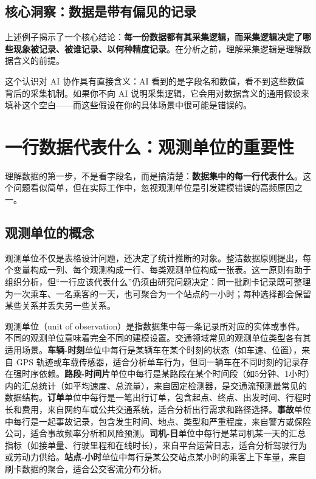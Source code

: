 \subsection{核心洞察：数据是带有偏见的记录}

上述例子揭示了一个核心结论：\textbf{每一份数据都有其采集逻辑，而采集逻辑决定了哪些现象被记录、被谁记录、以何种精度记录}。在分析之前，理解采集逻辑是理解数据含义的前提。

这个认识对 AI 协作具有直接含义：AI 看到的是字段名和数值，看不到这些数值背后的采集机制。如果你不向 AI 说明采集逻辑，它会用对数据含义的通用假设来填补这个空白——而这些假设在你的具体场景中很可能是错误的。

\section{一行数据代表什么：观测单位的重要性}

理解数据的第一步，不是看字段名，而是搞清楚：\textbf{数据集中的每一行代表什么}。这个问题看似简单，但在实际工作中，忽视观测单位是引发建模错误的高频原因之一。

\subsection{观测单位的概念}

观测单位不仅是表格设计问题，还决定了统计推断的对象。整洁数据原则提出，每个变量构成一列、每个观测构成一行、每类观测单位构成一张表\cite{wickham2014tidy}。这一原则有助于组织分析，但“一行应该代表什么”仍须由研究问题决定：同一批刷卡记录既可整理为一次乘车、一名乘客的一天，也可聚合为一个站点的一小时；每种选择都会保留某些关系并丢失另一些关系。

观测单位（unit of observation）是指数据集中每一条记录所对应的实体或事件。不同的观测单位意味着完全不同的建模设置。交通领域常见的观测单位类型各有其适用场景。\textbf{车辆-时刻}单位中每行是某辆车在某个时刻的状态（如车速、位置），来自 GPS 轨迹或车载传感器，适合分析单车行为，但同一辆车在不同时刻的记录存在强时序依赖。\textbf{路段-时间片}单位中每行是某路段在某个时间段（如5分钟、1小时）内的汇总统计（如平均速度、总流量），来自固定检测器，是交通流预测最常见的数据结构。\textbf{订单}单位中每行是一笔出行订单，包含起点、终点、出发时间、行程时长和费用，来自网约车或公共交通系统，适合分析出行需求和路径选择。\textbf{事故}单位中每行是一起事故记录，包含发生时间、地点、类型和严重程度，来自警方或保险公司，适合事故频率分析和风险预测。\textbf{司机-日}单位中每行是某司机某一天的汇总指标（如接单量、行驶里程和在线时长），来自平台运营日志，适合分析驾驶行为或劳动力供给。\textbf{站点-小时}单位中每行是某公交站点某小时的乘客上下车量，来自刷卡数据的聚合，适合公交客流分布分析。

